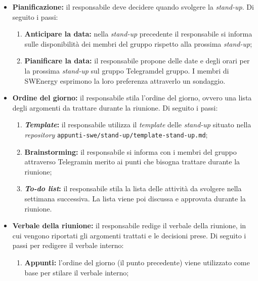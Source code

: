 \begin{itemize}

	\item \textbf{Pianificazione:} il responsabile deve decidere quando
	      svolgere la \textit{stand-up}. Di seguito i passi:
	      \begin{enumerate}
		      \item \textbf{Anticipare la data:} nella \textit{stand-up}
		            precedente il responsabile si informa sulle disponibilità
		            dei membri del gruppo rispetto alla prossima
		            \textit{stand-up};

		      \item \textbf{Pianificare la data:} il responsabile propone delle
		            date e degli orari per la prossima \textit{stand-up} sul
		            gruppo Telegram\g del gruppo. I membri di SWEnergy esprimono
		            la loro preferenza attraverlo un sondaggio.
	      \end{enumerate}

	\item \textbf{Ordine del giorno:} il responsabile stila l'ordine del
	      giorno, ovvero una lista degli argomenti da trattare durante la
	      riunione. Di seguito i passi:
	      \begin{enumerate}
		      \item \textbf{\textit{Template}:} il responsabile utilizza il \textit{template}
		            delle \textit{stand-up} situato nella \textit{repository\g}
		            \texttt{appunti-swe/stand-up/template-stand-up.md};

		      \item \textbf{Brainstorming:} il responsabile si informa con i
		            membri del gruppo attraverso Telegram\g in merito ai
		            punti che bisogna trattare durante la riunione;

		      \item \textbf{\textit{To-do list}:} il responsabile stila la lista
		            delle attività da svolgere nella settimana successiva. La
		            lista viene poi discussa e approvata durante la riunione.
	      \end{enumerate}

	\item \textbf{Verbale della riunione:} il responsabile redige il
	      verbale della riunione, in cui vengono riportati gli argomenti
	      trattati e le decisioni prese. Di seguito i passi per redigere il
	      verbale interno:
	      \begin{enumerate}
		      \item \textbf{Appunti:} l'ordine del giorno (il punto precedente)
		            viene utilizzato come base per stilare il verbale interno;


\end{enumerate}
\end{itemize}
